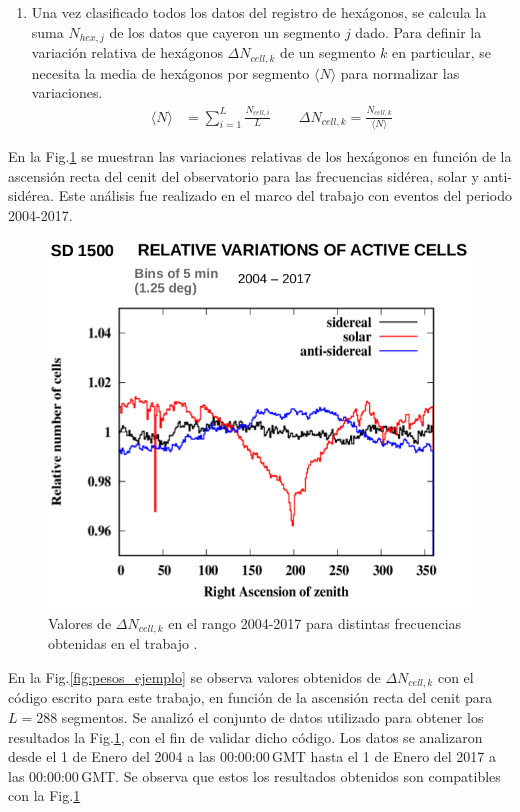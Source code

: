 \begin{enumerate}
        \item Una vez clasificado todos los datos del registro de hexágonos, se calcula la suma  $N_{hex, j}$ de los datos que cayeron un segmento $j$ dado. Para definir la variación relativa de hexágonos  $\Delta N_{cell,k}$ de un segmento $k$ en particular, se necesita la media de hexágonos por segmento $ \langle N \rangle$  para normalizar las variaciones.
       \begin{align}
         \langle N \rangle &= \sum^{L}_{i=1} \frac{N_{cell, i}}{L}  \qquad
         \Delta N_{cell,k} = \frac{N_{cell, k}}{\langle N \rangle}  \label{epepe}
       \end{align}

      \end{enumerate}

      En la Fig.\ref{fig:pesos_referencia} se muestran las variaciones relativas de los hexágonos en función de la ascensión recta del cenit del observatorio para las frecuencias sidérea, solar y anti-sidérea. Este análisis fue realizado en el marco del trabajo \cite{referencia_pesos} con eventos del periodo 2004-2017. 

          \begin{figure}[H]
          \centering
              \includegraphics[width=0.5\linewidth]{pesos_referencia.png}  
              \caption{Valores de $\Delta N_{cell, k}$ en el rango 2004-2017 para distintas frecuencias obtenidas en el trabajo \cite{referencia_pesos}.}
              \label{fig:pesos_referencia}
        \end{figure}

       En la Fig.\ref{fig:pesos_ejemplo} se observa valores obtenidos de $\Delta N_{cell,k}$  con el código escrito para este trabajo, en función de la ascensión recta del cenit  para $L=288$ segmentos. Se analizó el conjunto de datos  utilizado para obtener los resultados la Fig.\ref{fig:pesos_referencia}, con el fin de validar dicho código. Los datos se analizaron desde el 1 de Enero del 2004 a las 00:00:00\,GMT  hasta el 1 de Enero del 2017 a las 00:00:00\,GMT. Se  observa que estos los resultados obtenidos son compatibles con la Fig.\ref{fig:pesos_referencia}
      

